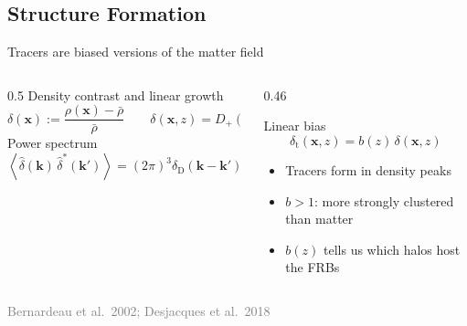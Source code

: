 \documentclass[aspectratio=1610, 10pt]{beamer}
\newcommand{\source}[1]{{\par\hfill\tiny\textcolor{gray}{#1}\par}}
\begin{document}
\subsection{Structure Formation}
\begin{frame}{Tracers are biased versions of the matter field}
  \begin{columns}[c]
    \begin{column}{0.5\textwidth}
      Density contrast and linear growth
      \begin{equation*}
        \delta(\mathbf{x}) := \frac{\rho(\mathbf{x}) - \bar{\rho}}{\bar{\rho}}
        \qquad
        \delta(\mathbf{x}, z) = D_+(z)\, \delta(\mathbf{x}, 0)
      \end{equation*}
      Power spectrum
      \begin{equation*}
        \left\langle \hat{\delta}(\mathbf{k})\, \hat{\delta}^{*}(\mathbf{k}') \right\rangle
        = (2\pi)^3 \delta_{\mathrm{D}}(\mathbf{k}-\mathbf{k}')\, P(k)
      \end{equation*}
    \end{column}
    \begin{column}{0.46\textwidth}
      \begin{block}{Linear bias}
        \begin{equation*}
          \delta_{\mathrm{t}}(\mathbf{x}, z) = b(z)\, \delta(\mathbf{x}, z)
        \end{equation*}
      \end{block}
      \begin{itemize}
        \item Tracers form in density peaks
        \item $b > 1$: more strongly clustered than matter
        \item $b(z)$ tells us \alert{which halos host the FRBs}
      \end{itemize}
    \end{column}
  \end{columns}
  \source{Bernardeau et al.\ 2002; Desjacques et al.\ 2018}
\end{frame}
\end{document}
